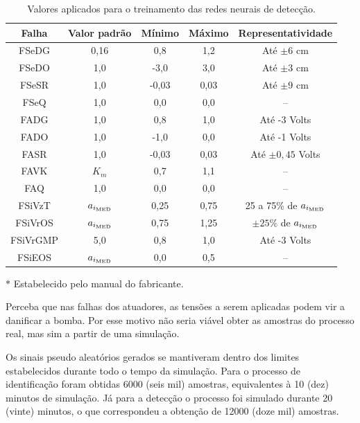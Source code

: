 \begin{table}[htb]
\small
\caption{Valores aplicados para o treinamento das redes neurais de detecção.}
\label{tab:valores_treinamento}
\vspace{0.25cm}
\centering
\begin{threeparttable}
\begin{tabular}{|c|c|c|c|c|}
\hline
{\bf Falha} & {\bf Valor padrão} & {\bf Mínimo} & {\bf Máximo} & 
{\bf Representatividade}\\
\hline
\hline
FSeDG & 0,16\tnote{$*$} & 
0,8 & 1,2 & Até $\pm 6$ cm\\
\hline
FSeDO & 1,0 & -3,0 & 3,0 & Até $\pm 3$ cm\\
\hline
FSeSR & 1,0 & -0,03 & 0,03 & Até $\pm 9$ cm\\
\hline
FSeQ & 1,0 & 0,0 & 0,0 & -- \\
\hline
\hline
FADG & 1,0 & 0,8 & 1,0 & Até -3 Volts\\
\hline
FADO & 1,0 & -1,0 & 0,0 & Até -1 Volts\\
\hline
FASR & 1,0 & -0,03 & 0,03 & Até $\pm 0,45$ Volts\\
\hline
FAVK & $K_m$ & 0,7 & 1,1 & --\\
\hline
FAQ & 1,0 & 0,0 & 0,0 & --\\
\hline
\hline
FSiVzT & $a_{i_{\text{\tiny MED}}}$ & 
0,25 & 0,75 & 25 a 75\% de $a_{i_{\text{\tiny MED}}}$\\
\hline
FSiVrOS & $a_{i_{\text{\tiny MED}}}$ & 
0,75 & 1,25 & $\pm 25\%$ de $a_{i_{\text{\tiny MED}}}$\\
\hline
FSiVrGMP & 5,0\tnote{$*$} & 
0,8 & 1,0 & Até -3 Volts\\
\hline
FSiEOS & $a_{i_{\text{\tiny MED}}}$ & 
0,0 & 0,5 & --\\
\hline
\end{tabular}
\begin{tablenotes}
\item [$*$] Estabelecido pelo manual do fabricante.
\end{tablenotes}
\end{threeparttable}
\end{table}

Perceba que nas falhas dos atuadores, as tensões a serem aplicadas podem vir a
danificar a bomba. Por esse motivo não seria viável obter as amostras do
processo real, mas sim a partir de uma simulação.

Os sinais pseudo aleatórios gerados se mantiveram dentro dos limites
estabelecidos durante todo o tempo da simulação. Para o processo de
identificação foram obtidas 6000 (seis mil) amostras, equivalentes à 10 (dez)
minutos de simulação. Já para a detecção o processo foi simulado durante 20
(vinte) minutos, o que correspondeu a obtenção de 12000 (doze mil) amostras.

